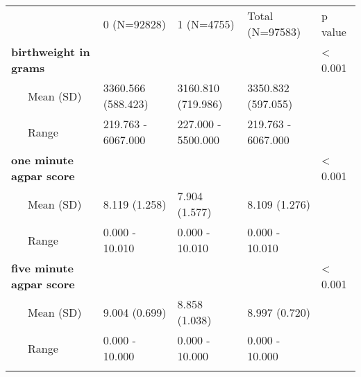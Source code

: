 \begin{longtable}[c]{@{}lllll@{}}
\toprule\addlinespace
& 0 (N=92828) & 1 (N=4755) & Total (N=97583) & p value
\\\addlinespace
\midrule\endhead
\textbf{birthweight in grams} & & & & \textless{} 0.001
\\\addlinespace
~~~Mean (SD) & 3360.566 (588.423) & 3160.810 (719.986) & 3350.832
(597.055) &
\\\addlinespace
~~~Range & 219.763 - 6067.000 & 227.000 - 5500.000 & 219.763 - 6067.000
&
\\\addlinespace
\textbf{one minute agpar score} & & & & \textless{} 0.001
\\\addlinespace
~~~Mean (SD) & 8.119 (1.258) & 7.904 (1.577) & 8.109 (1.276) &
\\\addlinespace
~~~Range & 0.000 - 10.010 & 0.000 - 10.010 & 0.000 - 10.010 &
\\\addlinespace
\textbf{five minute agpar score} & & & & \textless{} 0.001
\\\addlinespace
~~~Mean (SD) & 9.004 (0.699) & 8.858 (1.038) & 8.997 (0.720) &
\\\addlinespace
~~~Range & 0.000 - 10.000 & 0.000 - 10.000 & 0.000 - 10.000 &
\\\addlinespace
\bottomrule
\end{longtable}
